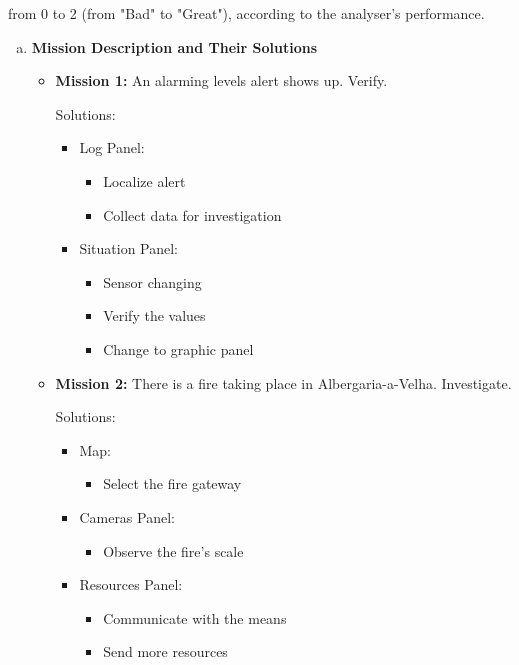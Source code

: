from 0 to 2 (from "Bad" to "Great"), according to the 
analyser's performance. 
\begin{enumerate}[a.]
    \item \textbf{Mission Description and Their Solutions}
    \begin{itemize}
        \item \textbf{Mission 1:} An alarming levels 
        alert shows up. Verify. \par 
        Solutions:
        \begin{itemize}
            \item Log Panel:
            \begin{itemize}
                \item Localize alert 
                \item Collect data for investigation
            \end{itemize}
            \item Situation Panel: 
            \begin{itemize}
                \item Sensor changing 
                \item Verify the values 
                \item Change to graphic panel
            \end{itemize}
        \end{itemize}
        \item \textbf{Mission 2:} There is a fire taking place 
        in Albergaria-a-Velha. Investigate. \par 
        Solutions:
        \begin{itemize}
            \item Map:
            \begin{itemize}
                \item Select the fire gateway 
            \end{itemize}
            \item Cameras Panel: 
            \begin{itemize}
                \item Observe the fire's scale 
            \end{itemize}
            \item Resources Panel: 
            \begin{itemize}
                \item Communicate with the means
                \item Send more resources 

\end{itemize}
\end{itemize}
\end{itemize}
\end{enumerate}
